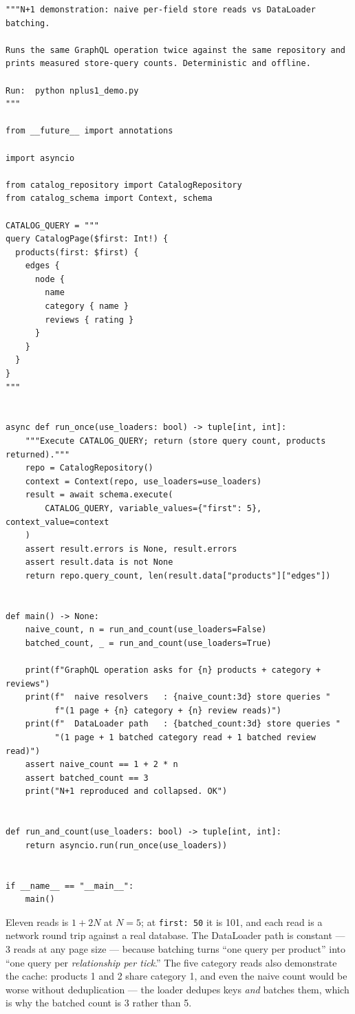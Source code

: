 \begin{verbatim}
"""N+1 demonstration: naive per-field store reads vs DataLoader batching.

Runs the same GraphQL operation twice against the same repository and
prints measured store-query counts. Deterministic and offline.

Run:  python nplus1_demo.py
"""

from __future__ import annotations

import asyncio

from catalog_repository import CatalogRepository
from catalog_schema import Context, schema

CATALOG_QUERY = """
query CatalogPage($first: Int!) {
  products(first: $first) {
    edges {
      node {
        name
        category { name }
        reviews { rating }
      }
    }
  }
}
"""


async def run_once(use_loaders: bool) -> tuple[int, int]:
    """Execute CATALOG_QUERY; return (store query count, products returned)."""
    repo = CatalogRepository()
    context = Context(repo, use_loaders=use_loaders)
    result = await schema.execute(
        CATALOG_QUERY, variable_values={"first": 5}, context_value=context
    )
    assert result.errors is None, result.errors
    assert result.data is not None
    return repo.query_count, len(result.data["products"]["edges"])


def main() -> None:
    naive_count, n = run_and_count(use_loaders=False)
    batched_count, _ = run_and_count(use_loaders=True)

    print(f"GraphQL operation asks for {n} products + category + reviews")
    print(f"  naive resolvers   : {naive_count:3d} store queries "
          f"(1 page + {n} category + {n} review reads)")
    print(f"  DataLoader path   : {batched_count:3d} store queries "
          "(1 page + 1 batched category read + 1 batched review read)")
    assert naive_count == 1 + 2 * n
    assert batched_count == 3
    print("N+1 reproduced and collapsed. OK")


def run_and_count(use_loaders: bool) -> tuple[int, int]:
    return asyncio.run(run_once(use_loaders))


if __name__ == "__main__":
    main()
\end{verbatim}

Eleven reads is $1 + 2N$ at $N=5$; at \texttt{first: 50} it is 101, and
each read is a network round trip against a real database. The DataLoader
path is constant --- 3 reads at any page size --- because batching turns
``one query per product'' into ``one query per \emph{relationship per
tick}.'' The five category reads also demonstrate the cache: products 1
and 2 share category 1, and even the naive count would be worse without
deduplication --- the loader dedupes keys \emph{and} batches them, which
is why the batched count is 3 rather than 5.

